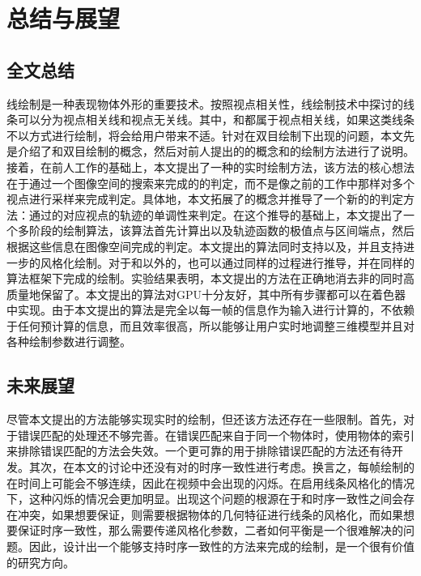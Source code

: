 \chapter{总结与展望}

\section{全文总结}

线绘制是一种表现物体外形的重要技术。按照视点相关性，线绘制技术中探讨的线条可以分为视点相关线和视点无关线。其中，\con{}和\scon{}都属于视点相关线，如果这类线条不以\stc{}方式进行绘制，将会给用户带来不适。针对\vdl{}在双目绘制下出现的问题，本文先是介绍了\vdl{}和双目绘制的概念，然后对前人提出的\epsl{}的概念和\stc{}\vdl{}的绘制方法进行了说明。接着，在前人工作的基础上，本文提出了一种\stc{}\vdl{}的实时绘制方法，该方法的核心想法在于通过一个图像空间的搜索来完成\vdp{}的\epsl{}的判定，而不是像之前的工作中那样对多个视点进行采样来完成\epsl{}判定。具体地，本文拓展了\epsl{}的概念并推导了一个新的\epsl{}的判定方法：通过\vdp{}的对应视点的轨迹的单调性来判定\epsl{}。在这个推导的基础上，本文提出了一个多阶段的绘制算法，该算法首先计算出\vdl{}以及轨迹函数的极值点与区间端点，然后根据这些信息在图像空间完成\epsl{}的判定。本文提出的算法同时支持\con{}以及\scon{}，并且支持进一步的风格化绘制。对于\con{}和\scon{}以外的\vdl{}，也可以通过同样的过程进行推导，并在同样的算法框架下完成\stc{}的绘制。实验结果表明，本文提出的方法在正确地消去非\stc{}\vdl{}的同时高质量地保留了\stc{}\epsl{}。本文提出的算法对GPU十分友好，其中所有步骤都可以在着色器中实现。由于本文提出的算法是完全以每一帧的信息作为输入进行计算的，不依赖于任何预计算的信息，而且效率很高，所以能够让用户实时地调整三维模型并且对各种绘制参数进行调整。

\section{未来展望}

尽管本文提出的方法能够实现实时的\stc{}\vdl{}绘制，但还该方法还存在一些限制。首先，对于错误匹配的处理还不够完善。在错误匹配来自于同一个物体时，使用物体的索引来排除错误匹配的方法会失效。一个更可靠的用于排除错误匹配的方法还有待开发。其次，在本文的讨论中还没有对\vdl{}的时序一致性进行考虑。换言之，每帧绘制的\vdl{}在时间上可能会不够连续，因此在视频中会出现\vdl{}的闪烁。在启用线条风格化的情况下，这种闪烁的情况会更加明显。出现这个问题的根源在于\stcy{}和时序一致性之间会存在冲突，如果想要保证\stcy{}，则需要根据物体的几何特征进行线条的风格化，而如果想要保证时序一致性，那么需要传递风格化参数，二者如何平衡是一个很难解决的问题。因此，设计出一个能够支持时序一致性的方法来完成\stc{}\vdl{}的绘制，是一个很有价值的研究方向。
